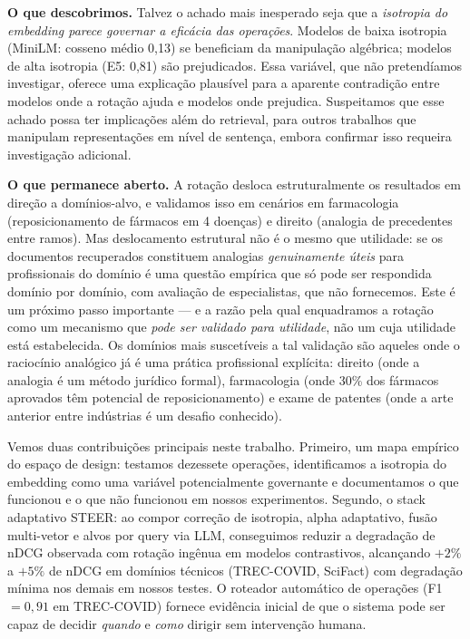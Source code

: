\documentclass{article}
\begin{document}
\textbf{O que descobrimos.} Talvez o achado mais inesperado seja que a \emph{isotropia do embedding parece governar a eficácia das operações}. Modelos de baixa isotropia (MiniLM: cosseno médio 0,13) se beneficiam da manipulação algébrica; modelos de alta isotropia (E5: 0,81) são prejudicados. Essa variável, que não pretendíamos investigar, oferece uma explicação plausível para a aparente contradição entre modelos onde a rotação ajuda e modelos onde prejudica. Suspeitamos que esse achado possa ter implicações além do retrieval, para outros trabalhos que manipulam representações em nível de sentença, embora confirmar isso requeira investigação adicional.

\textbf{O que permanece aberto.} A rotação desloca estruturalmente os resultados em direção a domínios-alvo, e validamos isso em cenários em farmacologia (reposicionamento de fármacos em 4 doenças) e direito (analogia de precedentes entre ramos). Mas deslocamento estrutural não é o mesmo que utilidade: se os documentos recuperados constituem analogias \emph{genuinamente úteis} para profissionais do domínio é uma questão empírica que só pode ser respondida domínio por domínio, com avaliação de especialistas, que não fornecemos. Este é um próximo passo importante --- e a razão pela qual enquadramos a rotação como um mecanismo que \emph{pode ser validado para utilidade}, não um cuja utilidade está estabelecida. Os domínios mais suscetíveis a tal validação são aqueles onde o raciocínio analógico já é uma prática profissional explícita: direito (onde a analogia é um método jurídico formal), farmacologia (onde 30\% dos fármacos aprovados têm potencial de reposicionamento) e exame de patentes (onde a arte anterior entre indústrias é um desafio conhecido).

Vemos duas contribuições principais neste trabalho. Primeiro, um mapa empírico do espaço de design: testamos dezessete operações, identificamos a isotropia do embedding como uma variável potencialmente governante e documentamos o que funcionou e o que não funcionou em nossos experimentos. Segundo, o stack adaptativo STEER: ao compor correção de isotropia, alpha adaptativo, fusão multi-vetor e alvos por query via LLM, conseguimos reduzir a degradação de nDCG observada com rotação ingênua em modelos contrastivos, alcançando $+2\%$ a $+5\%$ de nDCG em domínios técnicos (TREC-COVID, SciFact) com degradação mínima nos demais em nossos testes. O roteador automático de operações (F1$=0{,}91$ em TREC-COVID) fornece evidência inicial de que o sistema pode ser capaz de decidir \emph{quando} e \emph{como} dirigir sem intervenção humana.
\end{document}
